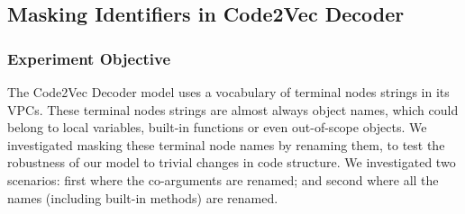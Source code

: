 




\subsection{Masking Identifiers in Code2Vec Decoder} %
\label{sub:comparing_code2vec_altered}

\subsubsection{Experiment Objective} %

The Code2Vec Decoder model uses a vocabulary of terminal nodes strings in its VPCs. 
These terminal nodes strings are almost always object names, which could belong to local variables, built-in functions or even out-of-scope objects. 
We investigated masking these terminal node names by renaming them, to test the robustness of our model to trivial changes in  code structure. 
We investigated two scenarios: first where the co-arguments are renamed; and second where all the names (including built-in methods) are renamed.




